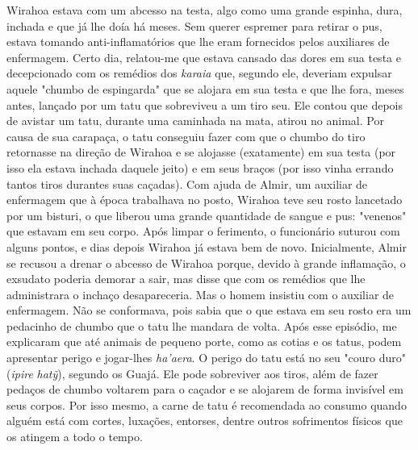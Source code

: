 Wirahoa estava com um abcesso na testa, algo como uma grande espinha,
dura, inchada e que já lhe doía há meses. Sem querer espremer para
retirar o pus, estava tomando anti-inflamatórios que lhe eram fornecidos
pelos auxiliares de enfermagem. Certo dia, relatou-me que estava cansado
das dores em sua testa e decepcionado com os remédios dos \emph{karaia}
que, segundo ele, deveriam expulsar aquele "chumbo de espingarda" que se
alojara em sua testa e que lhe fora, meses antes, lançado por um tatu
que sobreviveu a um tiro seu. Ele contou que depois de avistar um tatu,
durante uma caminhada na mata, atirou no animal. Por causa de sua
carapaça, o tatu conseguiu fazer com que o chumbo do tiro retornasse na
direção de Wirahoa e se alojasse (exatamente) em sua testa (por isso ela
estava inchada daquele jeito) e em seus braços (por isso vinha errando
tantos tiros durantes suas caçadas). Com ajuda de Almir, um auxiliar de
enfermagem que à época trabalhava no posto, Wirahoa teve seu rosto
lancetado por um bisturi, o que liberou uma grande quantidade de sangue
e pus: "venenos" que estavam em seu corpo. Após limpar o ferimento, o
funcionário suturou com alguns pontos, e dias depois Wirahoa já estava
bem de novo. Inicialmente, Almir se recusou a drenar o abcesso de
Wirahoa porque, devido à grande inflamação, o exsudato poderia demorar a
sair, mas disse que com os remédios que lhe administrara o inchaço
desapareceria. Mas o homem insistiu com o auxiliar de enfermagem. Não se
conformava, pois sabia que o que estava em seu rosto era um pedacinho de
chumbo que o tatu lhe mandara de volta. Após esse episódio, me
explicaram que até animais de pequeno porte, como as cotias e os tatus,
podem apresentar perigo e jogar-lhes \emph{ha'aera}. O perigo do tatu
está no seu "couro duro" (\emph{ipire} \emph{hatỹ}), segundo os Guajá.
Ele pode sobreviver aos tiros, além de fazer pedaços de chumbo voltarem
para o caçador e se alojarem de forma invisível em seus corpos. Por isso
mesmo, a carne de tatu é recomendada ao consumo quando alguém está com
cortes, luxações, entorses, dentre outros sofrimentos físicos que os
atingem a todo o tempo.

